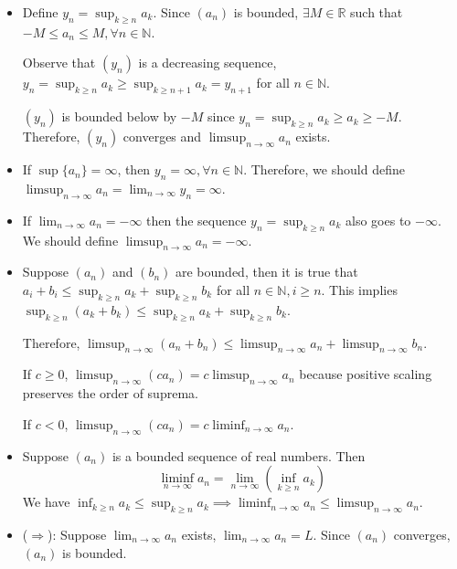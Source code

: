\begin{solution}
    \begin{itemize}
        \item[(a)]
              Define $y_n = \sup_{k \ge n} a_k$. Since $(a_n)$ is bounded,
              $\exists M \in \mathbb{R}$ such that $-M \le a_n \le M, \forall n \in \mathbb{N}$.

              Observe that $(y_n)$ is a decreasing sequence, $y_n = \sup_{k \ge n} a_k \ge \sup_{k \ge n+1}
                  a_k = y_{n+1}$ for all $n \in \mathbb{N}$.

              $(y_n)$ is bounded below by $-M$ since $y_n = \sup_{k \ge n} a_k \ge a_k \ge -M$.
              Therefore, $(y_n)$ converges and $\limsup_{n \to \infty} a_n$ exists.
        \item[(b)]
              If $\sup \{a_n\} = \infty$, then $y_n = \infty, \forall n \in \mathbb{N}$. Therefore,
              we should define $\limsup_{n \to \infty} a_n = \lim_{n \to \infty} y_n = \infty$.
        \item[(c)]
              If $\lim_{n \to \infty} a_n = -\infty$ then the sequence
              $y_n = \sup_{k \ge n} a_k$ also goes to $-\infty$. We should define
              $\limsup_{n \to \infty} a_n = -\infty$.
        \item[(d)]
              Suppose $(a_n)$ and $(b_n)$ are bounded, then it is true that $a_i + b_i
                  \le \sup_{k \ge n} a_k + \sup_{k \ge n} b_k$ for all $n \in \mathbb{N}, i \ge n$.
              This implies $\sup_{k \ge n} (a_k + b_k) \le \sup_{k \ge n} a_k + \sup_{k \ge n} b_k$.

              Therefore, $\limsup_{n \to \infty} (a_n + b_n) \le \limsup_{n \to \infty} a_n + \limsup_{n \to \infty} b_n$.

              If $c \ge 0$, $\limsup_{n \to \infty} (c a_n) = c \limsup_{n \to \infty} a_n$ because positive
              scaling preserves the order of suprema.

              If $c < 0$, $\limsup_{n \to \infty} (c a_n) = c \liminf_{n \to \infty} a_n$.
        \item[(e)]
              Suppose $(a_n)$ is a bounded sequence of real numbers. Then
              \[
                  \liminf_{n \to \infty} a_n = \lim_{n \to \infty} \left( \inf_{k \ge n} a_k \right)
              \]
              We have $\inf_{k \ge n} a_k \le \sup_{k \ge n} a_k \implies \liminf_{n \to \infty} a_n \le \limsup_{n \to \infty} a_n$.

        \item[(f)]($\Rightarrow$): Suppose $\lim_{n \to \infty} a_n$ exists, $\lim_{n \to \infty} a_n = L$. Since $(a_n)$ converges, $(a_n)$ is bounded.


\end{itemize}
\end{solution}
